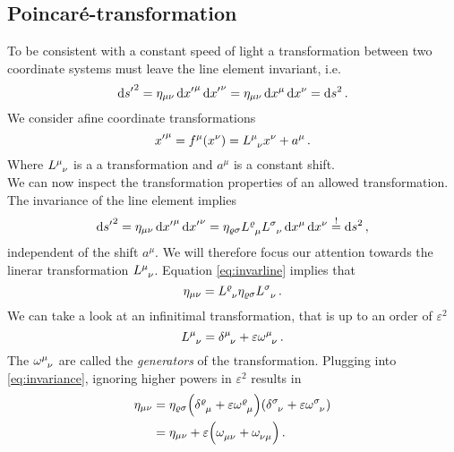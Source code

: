 \subsection{Poincaré-transformation}
To be consistent with a constant speed of light a transformation between two
coordinate systems must leave the line element invariant, i.e.
\begin{equation}
    \dif {s^\prime}^2 = \eta_{\mu\nu}\dif {x^\prime}^\mu\dif
    {x^\prime}^\nu=\eta_{\mu\nu}\dif x^\mu\dif
    x^\nu = \dif s^2\,. \label{eq:invarline}
\end{equation}
We consider afine coordinate transformations
\begin{equation}
    {x^\prime}^\mu= f^\mu(x^\nu)=\tensor{L}{^\mu_\nu}x^\nu+a^\mu\, .
\end{equation}
Where $\tensor{L}{^\mu_\nu}$ is a a  transformation and $a^\mu$
is a constant shift.\\
We can now inspect the transformation properties of an allowed transformation.
The invariance of the line element implies
\begin{equation}
    \dif {s^\prime}^2 = \eta_{\mu\nu}\dif {x^\prime}^\mu\dif
    {x^\prime}^\nu=\eta_{\varrho\sigma}\tensor{L}{^\varrho_\mu}\tensor{L}{^\sigma_\nu}\dif
    x^\mu\dif x^\nu \stackrel{!}{=} \dif s^2\,,
\end{equation}
independent of the shift $a^\mu$. We will therefore focus our attention towards
the linerar transformation $\tensor{L}{^\mu_\nu}$. Equation
\eqref{eq:invarline} implies that
\begin{equation}
    \eta_{\mu\nu}=\tensor{L}{^\varrho_\nu}\eta_{\varrho\sigma}\tensor{L}{^\sigma_\nu}\,.\label{eq:invariance}
\end{equation}
We can take a look at an infinitimal transformation, that is up to an order of
$\varepsilon^2$
\begin{equation}
    \tensor{L}{^\mu_\nu}=\tensor{\delta}{^\mu_\nu}
    +\varepsilon\tensor{\omega}{^\mu_\nu}\, .
\end{equation}
The $\tensor{\omega}{^\mu_\nu}$ are called the \emph{generators} of the
transformation. Plugging into \eqref{eq:invariance}, ignoring higher powers in
$\varepsilon^2$ results in
\begin{equation}
    \begin{split}
        \eta_{\mu\nu}&=\eta_{\varrho\sigma}\left(\tensor{\delta}{^\varrho_\mu}
        +\varepsilon\tensor{\omega}{^\varrho_\mu}\right)\left(\tensor{\delta}{^\sigma_\nu}
        +\varepsilon\tensor{\omega}{^\sigma_\nu}\right)\\
        &=
        \eta_{\mu\nu}+\varepsilon\left(\tensor{\omega}{_\mu_\nu}+\tensor{\omega}{_\nu_\mu}\right)\,
        .
    \end{split}
\end{equation}
